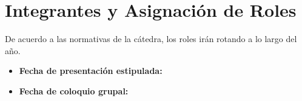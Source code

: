 \chapter{Integrantes y Asignación de Roles}
De acuerdo a las normativas de la cátedra, los roles irán rotando a lo largo del año.
\begin{table}[H]
    \centering
    \caption{Tabla de asignación de roles del grupo.}
\end{table}

\begin{itemize}
    \item \textbf{Fecha de presentación estipulada:} 
    \item \textbf{Fecha de coloquio grupal:} 
\end{itemize}
